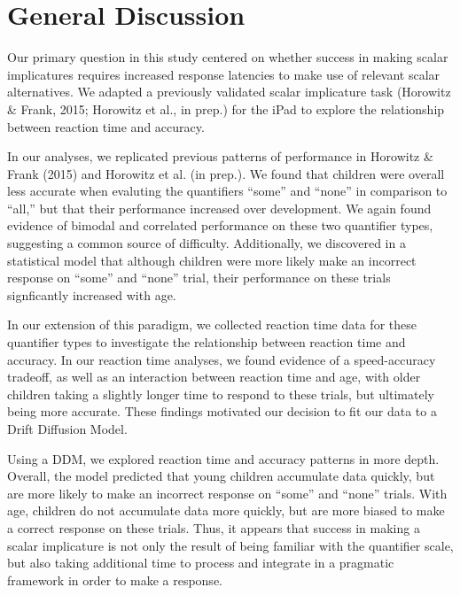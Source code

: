 \documentclass[10pt, letterpaper]{article}
\begin{document}
\section{General Discussion}\label{general-discussion}

Our primary question in this study centered on whether success in making
scalar implicatures requires increased response latencies to make use of
relevant scalar alternatives. We adapted a previously validated scalar
implicature task (Horowitz \& Frank, 2015; Horowitz et al., in prep.)
for the iPad to explore the relationship between reaction time and
accuracy.

In our analyses, we replicated previous patterns of performance in
Horowitz \& Frank (2015) and Horowitz et al. (in prep.). We found that
children were overall less accurate when evaluting the quantifiers
``some'' and ``none'' in comparison to ``all,'' but that their
performance increased over development. We again found evidence of
bimodal and correlated performance on these two quantifier types,
suggesting a common source of difficulty. Additionally, we discovered in
a statistical model that although children were more likely make an
incorrect response on ``some'' and ``none'' trial, their performance on
these trials signficantly increased with age.

In our extension of this paradigm, we collected reaction time data for
these quantifier types to investigate the relationship between reaction
time and accuracy. In our reaction time analyses, we found evidence of a
speed-accuracy tradeoff, as well as an interaction between reaction time
and age, with older children taking a slightly longer time to respond to
these trials, but ultimately being more accurate. These findings
motivated our decision to fit our data to a Drift Diffusion Model.

Using a DDM, we explored reaction time and accuracy patterns in more
depth. Overall, the model predicted that young children accumulate data
quickly, but are more likely to make an incorrect response on ``some''
and ``none'' trials. With age, children do not accumulate data more
quickly, but are more biased to make a correct response on these trials.
Thus, it appears that success in making a scalar implicature is not only
the result of being familiar with the quantifier scale, but also taking
additional time to process and integrate in a pragmatic framework in
order to make a response.
\end{document}
